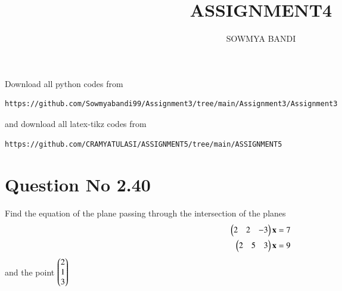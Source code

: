\documentclass[journal,12pt,twocolumn]{IEEEtran}
\begin{document}
     \def\rightbox#1{\makebox[0in][r]{#1}}
     \def\centbox#1{\makebox[0in]{#1}}
     \def\topbox#1{\raisebox{-\baselineskip}[0in][0in]{#1}}
     \def\midbox#1{\raisebox{-0.5\baselineskip}[0in][0in]{#1}}
\vspace{3cm}
\title{ASSIGNMENT4}
\author{SOWMYA BANDI}
\maketitle
\newpage
\bigskip
\renewcommand{\thefigure}{\theenumi}
\renewcommand{\thetable}{\theenumi}
Download all python codes from 
\begin{lstlisting}
https://github.com/Sowmyabandi99/Assignment3/tree/main/Assignment3/Assignment3
\end{lstlisting}
%
and download all latex-tikz codes from 
%
\begin{lstlisting}
https://github.com/CRAMYATULASI/ASSIGNMENT5/tree/main/ASSIGNMENT5
\end{lstlisting}
%
\section{Question No 2.40}
Find the equation of the plane passing through the intersection of the planes 
\begin{align}
\begin{pmatrix}2 & 2 & -3\end{pmatrix}\mathbf{x}&=7 \label{eq1}
\\
\begin{pmatrix}2 & 5 & 3\end{pmatrix}\mathbf{x}&=9 \label{eq2}
\end{align}
%
and the point $\begin{pmatrix}2\\ 1 \\ 3\end{pmatrix}$ \label{eq3}
\end{document}

